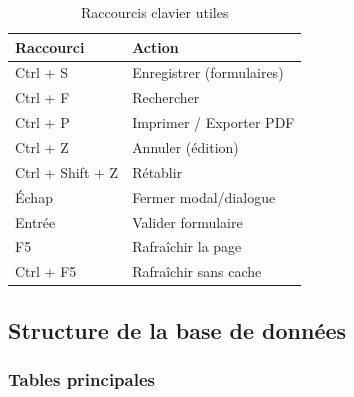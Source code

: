 \begin{table}[h]
\centering
\begin{tabular}{|l|l|}
\hline
\textbf{Raccourci} & \textbf{Action} \\
\hline
Ctrl + S & Enregistrer (formulaires) \\
Ctrl + F & Rechercher \\
Ctrl + P & Imprimer / Exporter PDF \\
Ctrl + Z & Annuler (édition) \\
Ctrl + Shift + Z & Rétablir \\
Échap & Fermer modal/dialogue \\
Entrée & Valider formulaire \\
F5 & Rafraîchir la page \\
Ctrl + F5 & Rafraîchir sans cache \\
\hline
\end{tabular}
\caption{Raccourcis clavier utiles}
\end{table}

\subsection{Structure de la base de données}

\subsubsection{Tables principales}

